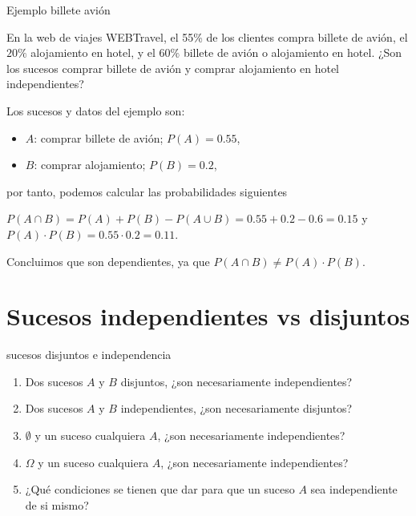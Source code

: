 \documentclass[
  letterpaper,
  DIV=11,
  numbers=noendperiod]{scrreprt}
\providecommand{\tightlist}{%
  \setlength{\itemsep}{0pt}\setlength{\parskip}{0pt}}\usepackage{longtable,booktabs,array}
\begin{document}
\begin{Ejemplo}{Ejemplo billete avión}{}

En la web de viajes WEBTravel, el 55\% de los clientes compra billete de
avión, el \(20\%\) alojamiento en hotel, y el \(60\%\) billete de avión
o alojamiento en hotel. ¿Son los sucesos comprar billete de avión y
comprar alojamiento en hotel independientes?

Los sucesos y datos del ejemplo son:

\begin{itemize}
\tightlist
\item
  \(A\): comprar billete de avión; \(P(A)=0.55\),
\item
  \(B\): comprar alojamiento; \(P(B)=0.2\),
\end{itemize}

por tanto, podemos calcular las probabilidades siguientes

\(P(A\cap B)=P(A)+P(B)-P(A\cup B)=0.55+0.2-0.6=0.15\) y
\(P(A)\cdot P(B) = 0.55\cdot 0.2=0.11.\)

Concluimos que son dependientes, ya que
\(P(A\cap B)\neq P(A)\cdot P(B)\).

\end{Ejemplo}

\section{Sucesos independientes vs
disjuntos}\label{sucesos-independientes-vs-disjuntos}

\begin{Ejercicio}{sucesos disjuntos e independencia}{}

\begin{enumerate}
\def\labelenumi{\arabic{enumi}.}
\tightlist
\item
  Dos sucesos \(A\) y \(B\) disjuntos, ¿son necesariamente
  independientes?
\item
  Dos sucesos \(A\) y \(B\) independientes, ¿son necesariamente
  disjuntos?
\item
  \(\emptyset\) y un suceso cualquiera \(A\), ¿son necesariamente
  independientes?
\item
  \(\Omega\) y un suceso cualquiera \(A\), ¿son necesariamente
  independientes?
\item
  ¿Qué condiciones se tienen que dar para que un suceso \(A\) sea
  independiente de si mismo?
\end{enumerate}

\end{Ejercicio}
\end{document}
